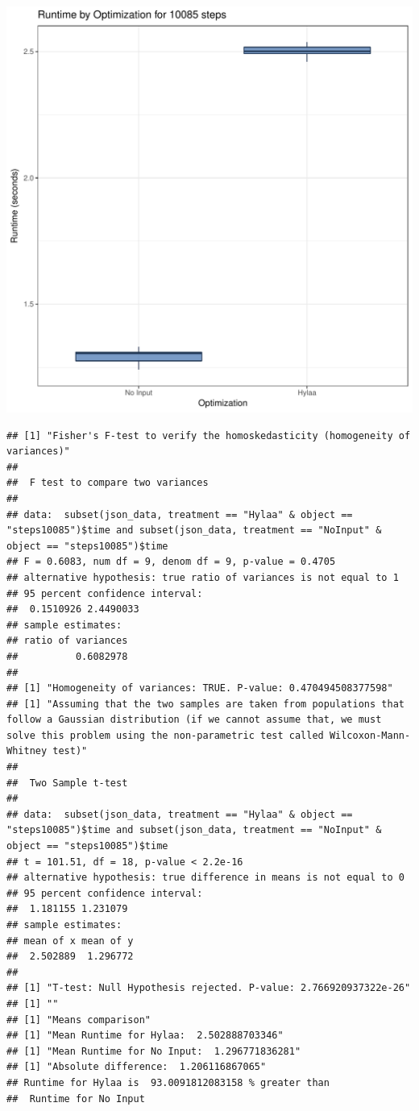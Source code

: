 \documentclass{article}\usepackage[]{graphicx}\usepackage[]{color}
\makeatletter
\def\maxwidth{ %
  \ifdim\Gin@nat@width>\linewidth
    \linewidth
  \else
    \Gin@nat@width
  \fi
}
\newenvironment{kframe}{%
 \def\at@end@of@kframe{}%
 \ifinner\ifhmode%
  \def\at@end@of@kframe{\end{minipage}}%
  \begin{minipage}{\columnwidth}%
 \fi\fi%
 \def\FrameCommand##1{\hskip\@totalleftmargin \hskip-\fboxsep
 \colorbox{shadecolor}{##1}\hskip-\fboxsep
     \hskip-\linewidth \hskip-\@totalleftmargin \hskip\columnwidth}%
 \MakeFramed {\advance\hsize-\width
   \@totalleftmargin\z@ \linewidth\hsize
   \@setminipage}}%
 {\par\unskip\endMakeFramed%
 \at@end@of@kframe}
\newenvironment{knitrout}{}{} %
\makeatother
\begin{document}
\begin{knitrout}
\color{fgcolor}
\includegraphics[width=\maxwidth]{figure/RH4_steps10085-1} 
\begin{kframe}\begin{verbatim}
## [1] "Fisher's F-test to verify the homoskedasticity (homogeneity of variances)"
## 
## 	F test to compare two variances
## 
## data:  subset(json_data, treatment == "Hylaa" & object == "steps10085")$time and subset(json_data, treatment == "NoInput" & object == "steps10085")$time
## F = 0.6083, num df = 9, denom df = 9, p-value = 0.4705
## alternative hypothesis: true ratio of variances is not equal to 1
## 95 percent confidence interval:
##  0.1510926 2.4490033
## sample estimates:
## ratio of variances 
##          0.6082978 
## 
## [1] "Homogeneity of variances: TRUE. P-value: 0.470494508377598"
## [1] "Assuming that the two samples are taken from populations that follow a Gaussian distribution (if we cannot assume that, we must solve this problem using the non-parametric test called Wilcoxon-Mann-Whitney test)"
## 
## 	Two Sample t-test
## 
## data:  subset(json_data, treatment == "Hylaa" & object == "steps10085")$time and subset(json_data, treatment == "NoInput" & object == "steps10085")$time
## t = 101.51, df = 18, p-value < 2.2e-16
## alternative hypothesis: true difference in means is not equal to 0
## 95 percent confidence interval:
##  1.181155 1.231079
## sample estimates:
## mean of x mean of y 
##  2.502889  1.296772 
## 
## [1] "T-test: Null Hypothesis rejected. P-value: 2.766920937322e-26"
## [1] ""
## [1] "Means comparison"
## [1] "Mean Runtime for Hylaa:  2.502888703346"
## [1] "Mean Runtime for No Input:  1.296771836281"
## [1] "Absolute difference:  1.206116867065"
## Runtime for Hylaa is  93.0091812083158 % greater than 
##  Runtime for No Input
\end{verbatim}
\end{kframe}
\end{knitrout}
\end{document}
